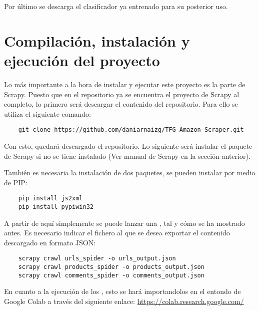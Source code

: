 Por último se descarga el clasificador ya entrenado para su posterior uso.

\section{Compilación, instalación y ejecución del proyecto}

Lo más importante a la hora de instalar y ejecutar este proyecto es la parte de Scrapy. Puesto que en el repositorio ya se encuentra el proyecto de Scrapy al completo, lo primero será descargar el contenido del repositorio. Para ello se utiliza el siguiente comando:

\begin{verbatim}
    git clone https://github.com/daniarnaizg/TFG-Amazon-Scraper.git
\end{verbatim}

Con esto, quedará descargado el repositorio. Lo siguiente será instalar el paquete de Scrapy si no se tiene instalado (Ver manual de Scrapy en la sección anterior).

También es necesaria la instalación de dos paquetes, se pueden instalar por medio de PIP:

\begin{verbatim}
    pip install js2xml
    pip install pypiwin32
\end{verbatim}

A partir de aquí simplemente se puede lanzar una , tal y cómo se ha mostrado antes. Es necesario indicar el fichero al que se desea exportar el contenido descargado en formato JSON:

\begin{verbatim}
    scrapy crawl urls_spider -o urls_output.json
    scrapy crawl products_spider -o products_output.json
    scrapy crawl comments_spider -o comments_output.json
\end{verbatim}

En cuanto a la ejecución de los , esto se hará importandolos en el entondo de Google Colab a través del siguiente enlace:
\newline
\newline
\url{https://colab.research.google.com/}


